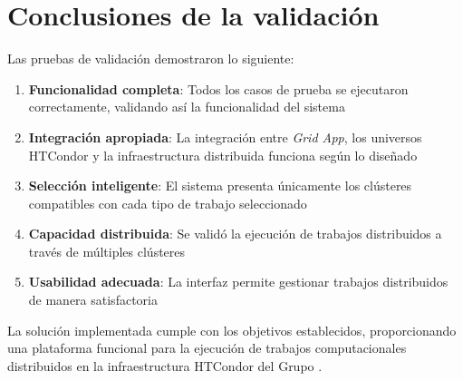 \section{Conclusiones de la validación}
\noindent

Las pruebas de validación demostraron lo siguiente:

\begin{enumerate}
	\item \textbf{Funcionalidad completa}: Todos los casos de prueba se ejecutaron correctamente, validando así la funcionalidad del sistema

	\item \textbf{Integración apropiada}: La integración entre \textit{Grid App}, los universos HTCondor y la infraestructura distribuida funciona según lo diseñado

	\item \textbf{Selección inteligente}: El sistema presenta únicamente los clústeres compatibles con cada tipo de trabajo seleccionado

	\item \textbf{Capacidad distribuida}: Se validó la ejecución de trabajos distribuidos a través de múltiples clústeres

	\item \textbf{Usabilidad adecuada}: La interfaz permite gestionar trabajos distribuidos de manera satisfactoria
\end{enumerate}

La solución implementada cumple con los objetivos establecidos, proporcionando una plataforma funcional para la ejecución de trabajos computacionales distribuidos en la infraestructura HTCondor del Grupo \GRID.
